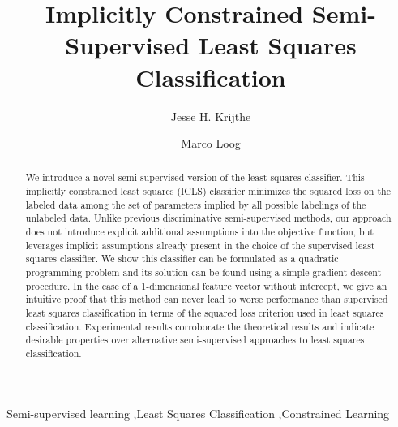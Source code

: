 \documentclass{elsarticle}
\begin{document}
\begin{frontmatter}



\title{Implicitly Constrained Semi-Supervised Least Squares Classification}

\author[lumc,prlab]{Jesse H. Krijthe}
\author[prlab,copenhagen]{Marco Loog}

\address[lumc]{Department of Molecular Epidemiology, Leiden University Medical Center}
\address[prlab]{Pattern Recognition Laboratory, Delft University of Technology}
\address[copenhagen]{The Image Group, University of Copenhagen}

\begin{abstract}
We introduce a novel semi-supervised version of the least squares classifier. 
This implicitly constrained least squares (ICLS) classifier minimizes the squared loss on the labeled data among the set of parameters implied by all possible labelings of the unlabeled data.
Unlike previous discriminative semi-supervised methods, our approach does not introduce explicit additional assumptions into the objective function, but leverages implicit assumptions already present in the choice of the supervised least squares classifier.  
We show this classifier can be formulated as a quadratic programming problem and its solution can be found using a simple gradient descent procedure. 
In the case of a 1-dimensional feature vector without intercept, we give an intuitive proof that this method can never lead to worse performance than supervised least squares classification in terms of the squared loss criterion used in least squares classification. 
Experimental results corroborate the theoretical results and indicate desirable properties over alternative semi-supervised approaches to least squares classification. 
\end{abstract}

\begin{keyword}
Semi-supervised learning \sep Least Squares Classification \sep Constrained Learning
\end{keyword}

\end{frontmatter}
\end{document}

